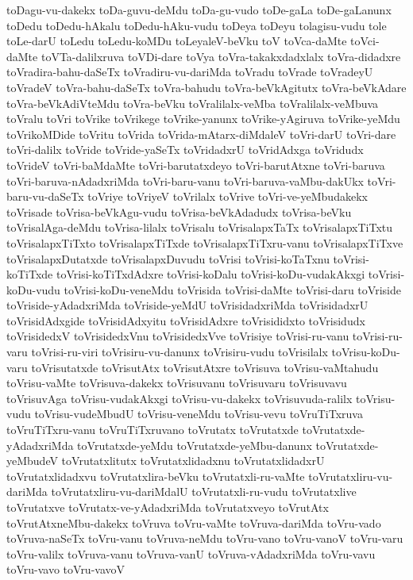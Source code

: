 {toDagu-vu-dakekx
toDa-guvu-deMdu
toDa-gu-vudo
toDe-gaLa
toDe-gaLanunx
toDedu
toDedu-hAkalu
toDedu-hAku-vudu
toDeya
toDeyu
tolagisu-vudu
tole
toLe-darU
toLedu
toLedu-koMDu
toLeyaleV-beVku
toV
toVca-daMte
toVci-daMte
toVTa-dalilxruva
toVDi-dare
toVya
toVra-takakxdadxlalx
toVra-didadxre
toVradira-bahu-daSeTx
toVradiru-vu-dariMda
toVradu
toVrade
toVradeyU
toVradeV
toVra-bahu-daSeTx
toVra-bahudu
toVra-beVkAgitutx
toVra-beVkAdare
toVra-beVkAdiVteMdu
toVra-beVku
toVralilalx-veMba
toVralilalx-veMbuva
toVralu
toVri
toVrike
toVrikege
toVrike-yanunx
toVrike-yAgiruva
toVrike-yeMdu
toVrikoMDide
toVritu
toVrida
toVrida-mAtarx-diMdaleV
toVri-darU
toVri-dare
toVri-dalilx
toVride
toVride-yaSeTx
toVridadxrU
toVridAdxga
toVridudx
toVrideV
toVri-baMdaMte
toVri-barutatxdeyo
toVri-barutAtxne
toVri-baruva
toVri-baruva-nAdadxriMda
toVri-baru-vanu
toVri-baruva-vaMbu-dakUkx
toVri-baru-vu-daSeTx
toVriye
toVriyeV
toVrilalx
toVrive
toVri-ve-yeMbudakekx
toVrisade
toVrisa-beVkAgu-vudu
toVrisa-beVkAdadudx
toVrisa-beVku
toVrisalAga-deMdu
toVrisa-lilalx
toVrisalu
toVrisalapxTaTx
toVrisalapxTiTxtu
toVrisalapxTiTxto
toVrisalapxTiTxde
toVrisalapxTiTxru-vanu
toVrisalapxTiTxve
toVrisalapxDutatxde
toVrisalapxDuvudu
toVrisi
toVrisi-koTaTxnu
toVrisi-koTiTxde
toVrisi-koTiTxdAdxre
toVrisi-koDalu
toVrisi-koDu-vudakAkxgi
toVrisi-koDu-vudu
toVrisi-koDu-veneMdu
toVrisida
toVrisi-daMte
toVrisi-daru
toVriside
toVriside-yAdadxriMda
toVriside-yeMdU
toVrisidadxriMda
toVrisidadxrU
toVrisidAdxgide
toVrisidAdxyitu
toVrisidAdxre
toVrisididxto
toVrisidudx
toVrisidedxV
toVrisidedxVnu
toVrisidedxVve
toVrisiye
toVrisi-ru-vanu
toVrisi-ru-varu
toVrisi-ru-viri
toVrisiru-vu-danunx
toVrisiru-vudu
toVrisilalx
toVrisu-koDu-varu
toVrisutatxde
toVrisutAtx
toVrisutAtxre
toVrisuva
toVrisu-vaMtahudu
toVrisu-vaMte
toVrisuva-dakekx
toVrisuvanu
toVrisuvaru
toVrisuvavu
toVrisuvAga
toVrisu-vudakAkxgi
toVrisu-vu-dakekx
toVrisuvuda-ralilx
toVrisu-vudu
toVrisu-vudeMbudU
toVrisu-veneMdu
toVrisu-vevu
toVruTiTxruva
toVruTiTxru-vanu
toVruTiTxruvano
toVrutatx
toVrutatxde
toVrutatxde-yAdadxriMda
toVrutatxde-yeMdu
toVrutatxde-yeMbu-danunx
toVrutatxde-yeMbudeV
toVrutatxlitutx
toVrutatxlidadxnu
toVrutatxlidadxrU
toVrutatxlidadxvu
toVrutatxlira-beVku
toVrutatxli-ru-vaMte
toVrutatxliru-vu-dariMda
toVrutatxliru-vu-dariMdalU
toVrutatxli-ru-vudu
toVrutatxlive
toVrutatxve
toVrutatx-ve-yAdadxriMda
toVrutatxveyo
toVrutAtx
toVrutAtxneMbu-dakekx
toVruva
toVru-vaMte
toVruva-dariMda
toVru-vado
toVruva-naSeTx
toVru-vanu
toVruva-neMdu
toVru-vano
toVru-vanoV
toVru-varu
toVru-valilx
toVruva-vanu
toVruva-vanU
toVruva-vAdadxriMda
toVru-vavu
toVru-vavo
toVru-vavoV
}
